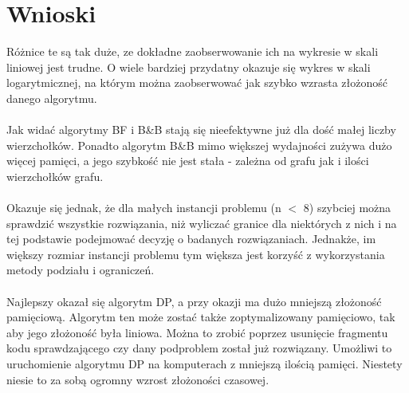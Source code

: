 \documentclass[12pt,a4paper,titlepage]{article}
\begin{document}
\section{Wnioski}

Różnice te są tak duże, ze dokładne zaobserwowanie ich na wykresie w skali liniowej jest trudne. O wiele bardziej przydatny okazuje się wykres w skali logarytmicznej, na którym można zaobserwować jak szybko wzrasta złożoność danego algorytmu.\\\\
Jak widać algorytmy BF i B\&B stają się nieefektywne już dla dość małej liczby wierzchołków. Ponadto algorytm B\&B mimo większej wydajności zużywa dużo więcej pamięci, a jego szybkość nie jest stała - zależna od grafu jak i ilości wierzchołków grafu.\\\\
Okazuje się jednak, że dla małych instancji problemu (n $<$ 8) szybciej można sprawdzić wszystkie rozwiązania, niż wyliczać granice dla niektórych z nich i na tej podstawie podejmować decyzję o badanych rozwiązaniach. Jednakże, im większy rozmiar instancji problemu tym większa jest korzyść z wykorzystania metody podziału i ograniczeń.\\\\
Najlepszy okazał się algorytm DP, a przy okazji ma dużo mniejszą złożoność pamięciową. Algorytm ten może zostać także zoptymalizowany pamięciowo, tak aby jego złożoność była liniowa. Można to zrobić poprzez usunięcie fragmentu kodu sprawdzającego czy dany podproblem został już rozwiązany. Umożliwi to uruchomienie algorytmu DP na komputerach z mniejszą ilością pamięci. Niestety niesie to za sobą ogromny wzrost złożoności czasowej.
\end{document}
